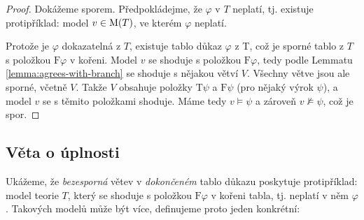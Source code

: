 \begin{proof}
Dokážeme sporem. Předpokládejme, že $\varphi$ v $T$ neplatí, tj. existuje protipříklad: model $v\in\operatorname{M}(T)$, ve kterém $\varphi$ neplatí.

Protože je $\varphi$ dokazatelná z $T$, existuje tablo důkaz $\varphi$ z T, což je sporné tablo z $T$ s položkou $\mathrm{F}\varphi$ v kořeni. Model $v$ se shoduje s položkou $\mathrm{F}\varphi$, tedy podle Lemmatu \ref{lemma:agrees-with-branch} se shoduje s nějakou větví $V$. Všechny větve jsou ale sporné, včetně $V$. Takže $V$ obsahuje položky $\mathrm{T}\psi$ a $\mathrm{F}\psi$ (pro nějaký výrok $\psi$), a model $v$ se s těmito položkami shoduje. Máme tedy $v\models\psi$ a zároveň $v\not\models\psi$, což je spor.

\end{proof}

\subsection{Věta o úplnosti}

Ukážeme, že \emph{bezesporná} větev v \emph{dokončeném} tablo důkazu poskytuje protipříklad: model teorie $T$, který se shoduje s položkou $\mathrm{F}\varphi$ v kořeni tabla, tj. neplatí v něm $\varphi$. Takových modelů může být více, definujeme proto jeden konkrétní:


